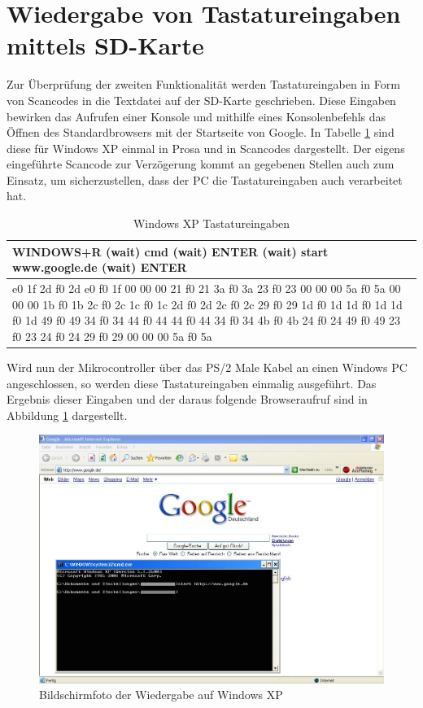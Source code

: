 \section{Wiedergabe von Tastatureingaben mittels SD-Karte}
Zur Überprüfung der zweiten Funktionalität werden Tastatureingaben in Form von Scancodes in die Textdatei auf der SD-Karte geschrieben. Diese Eingaben bewirken das Aufrufen einer Konsole und mithilfe eines Konsolenbefehls das Öffnen des Standardbrowsers mit der Startseite von Google. In Tabelle \ref{windows_test} sind diese für Windows XP einmal in Prosa und in Scancodes dargestellt. Der eigens eingeführte Scancode zur Verzögerung kommt an gegebenen Stellen auch zum Einsatz, um sicherzustellen, dass der PC die Tastatureingaben auch verarbeitet hat.
\begin{table}
  \begin{tabularx}{\textwidth}{|X|} \hline
    WINDOWS+R (wait) cmd (wait) ENTER (wait) start www.google.de (wait) ENTER \\ \hline
    e0 1f 2d f0 2d e0 f0 1f 00 00 00 21 f0 21 3a f0 3a 23 f0 23 00 00 00 5a f0 5a 00 00 00 1b f0 1b 2c f0 2c 1c f0 1c 2d f0 2d 2c f0 2c 29 f0 29 1d f0 1d 1d f0 1d 1d f0 1d 49 f0 49 34 f0 34 44 f0 44 44 f0 44 34 f0 34 4b f0 4b 24 f0 24 49 f0 49 23 f0 23 24 f0 24 29 f0 29 00 00 00 5a f0 5a \\ \hline
  \end{tabularx}
  \caption{Windows XP Tastatureingaben}
  \label{windows_test}
\end{table}

Wird nun der Mikrocontroller über das PS/2 Male Kabel an einen Windows PC angeschlossen, so werden diese Tastatureingaben einmalig ausgeführt. Das Ergebnis dieser Eingaben und der daraus folgende Browseraufruf sind in Abbildung \ref{writer} dargestellt.
\begin{figure}
  \centering
  \includegraphics[width=1\textwidth]{images/writer.jpg}
  \caption{Bildschirmfoto der Wiedergabe auf Windows XP}
  \label{writer}
\end{figure}

